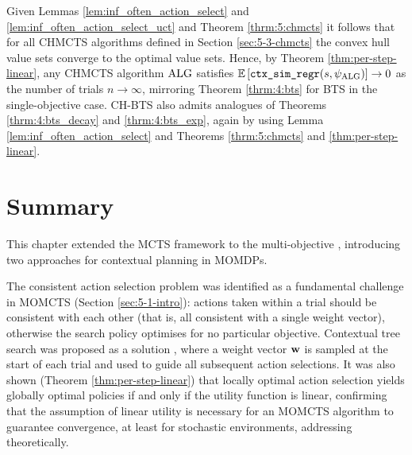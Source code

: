     Given Lemmas \ref{lem:inf_often_action_select} and \ref{lem:inf_often_action_select_uct} and Theorem \ref{thrm:5:chmcts} it follows that for all CHMCTS algorithms defined in Section \ref{sec:5-3-chmcts} the convex hull value sets converge to the optimal value sets. Hence, by Theorem \ref{thm:per-step-linear}, any CHMCTS algorithm ${\textnormal{ALG}}$ satisfies $\mathbb{E}\left[{\textnormal{\texttt{ctx\_sim\_regr}}}(s,\psi_{{\textnormal{ALG}}})\right] \rightarrow 0$ as the number of trials $n\rightarrow\infty$, mirroring Theorem \mbox{\ref{thrm:4:bts}} for BTS in the single-objective case. CH-BTS also admits analogues of Theorems \mbox{\ref{thrm:4:bts_decay}} and \mbox{\ref{thrm:4:bts_exp}}, again by using Lemma \mbox{\ref{lem:inf_often_action_select}} and Theorems \mbox{\ref{thrm:5:chmcts}} and \mbox{\ref{thm:per-step-linear}}.























\section{Summary}
\label{sec:5-7-summary}

    This chapter extended the MCTS framework to the
    multi-objective , introducing two approaches for contextual
    planning in MOMDPs.

    The consistent action selection problem was identified 
    as a fundamental challenge in MOMCTS (Section 
    \ref{sec:5-1-intro}): actions taken within a trial 
    should be consistent with each other (that is, all consistent with a single weight vector),
    otherwise the search policy optimises for no 
    particular objective. Contextual tree search was 
    proposed as a solution , where a weight vector 
    $\mathbf{w}$ is sampled at the start of each trial and 
    used to guide all subsequent action selections. It 
    was also shown (Theorem \ref{thm:per-step-linear}) 
    that locally optimal action selection yields globally 
    optimal policies if and only if the utility function 
    is linear, confirming that the assumption of linear utility is 
    necessary for an MOMCTS algorithm to guarantee 
    convergence, at least for stochastic environments, addressing \stochq\ewe theoretically.

